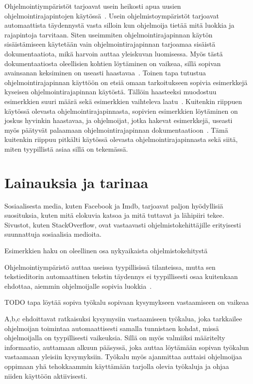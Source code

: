 \documentclass[finnish]{../tktltiki2}
\theoremstyle{definition}
\theoremstyle{remark}
\begin{document}
Ohjelmointiympäristöt tarjoavat usein heikosti apua uusien ohjelmointirajapintojen käytössä~\cite{jungloid-mining}. Usein ohjelmistoympäristöt tarjoavat automaattista täydennystä vasta silloin kun ohjelmoija tietää mitä luokkia ja rajapintoja tarvitaan. Siten useimmiten ohjelmointirajapinnan käytön sisäistämiseen käytetään vain ohjelmointirajapinnan tarjoamaa sisäistä dokumentaatiota, mikä harvoin auttaa yleiskuvan luomisessa. Myös tästä dokumentaatiosta oleellisien kohtien löytäminen on vaikeaa, sillä sopivan avainsanan keksiminen on useasti haastavaa~\cite{what-to-search-for}.
Toinen tapa tutustua ohjelmointirajapinnan käyttöön on etsiä omaan tarkoitukseen sopivia esimerkkejä kyseisen ohjelmointirajapinnan käytöstä. Tällöin haasteeksi muodostuu esimerkkien suuri määrä sekä esimerkkien vaihteleva laatu~\cite{example-overflow-social-media-for-code-recommendations}. Kuitenkin riippuen käytössä olevasta ohjelmointirajapinnasta, sopivien esimerkkien löytäminen on joskus hyvinkin haastavaa, ja ohjelmoijat, jotka hakevat esimerkkejä, useasti myös päätyvät palaamaan ohjelmointirajapinnan dokumentaatioon~\cite{asking-and-answering-api-questions}. Tämä kuitenkin riippuu pitkälti käytössä olevasta ohjelmointirajapinnasta sekä siitä, miten tyypillistä asiaa sillä on tekemässä.

\section{Lainauksia ja tarinaa}
Sosiaalisesta media, kuten Facebook ja Imdb, tarjoavat paljon hyödyllisiä suosituksia, kuten mitä elokuvia katsoa ja mitä tuttavat ja lähipiiri tekee. Sivustot, kuten StackOverflow, ovat vastaavasti ohjelmistokehittäjille erityisesti suunnattuja sosiaalisia medioita.


Esimerkkien haku on oleellinen osa nykyaikaista ohjelmistokehitystä \cite{example-overflow-social-media-for-code-recommendations}

Ohjelmointiympäristö auttaa useissa tyypillisissä tilanteissa, mutta sen tekstieditorin automaattinen tekstin täydennys ei tyypillisesti osaa kuitenkaan ehdottaa, aiemmin ohjelmoijalle sopivia luokkia~\cite{jungloid-mining}.

TODO tapa löytää sopiva työkalu sopivaan kysymykseen vastaamiseen on vaikeaa \cite{programmers-coach}

A,b,c ehdoittavat ratkaisuksi kysymysiin vastaamiseen työkalua, joka tarkkailee ohjelmoijan toimintaa automaattisesti samalla tunnistaen kohdat, missä ohjelmoijalla on tyypillisesti vaikeuksia. Sillä on myös valmiiksi määritelty informaatio, auttamaan alkuun pääsyssä, joka auttaa löytämään sopivan työkalun vastaamaan yleisiin kysymyksiin. Työkalu myös ajanmittaa auttaisi ohjelmoijaa oppimaan yhä tehokkaammin käyttämään tarjolla olevia työkaluja ja ohjaa niiden käyttöön aktiivisesti.
\cite{programmers-coach}
\end{document}
